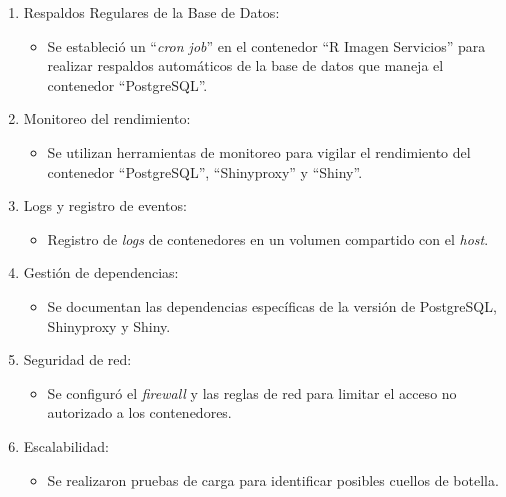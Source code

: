 \documentclass[
  12pt,
  openany]{book}
\providecommand{\tightlist}{%
  \setlength{\itemsep}{0pt}\setlength{\parskip}{0pt}}
\begin{document}
\begin{enumerate}
\def\labelenumi{\arabic{enumi}.}
\item
  Respaldos Regulares de la Base de Datos:

  \begin{itemize}
  \tightlist
  \item
    Se estableció un ``\emph{cron job}'' en el contenedor ``R Imagen Servicios'' para realizar respaldos automáticos de la base de datos que maneja el contenedor ``PostgreSQL''.
  \end{itemize}
\item
  Monitoreo del rendimiento:

  \begin{itemize}
  \tightlist
  \item
    Se utilizan herramientas de monitoreo para vigilar el rendimiento del contenedor ``PostgreSQL'', ``Shinyproxy'' y ``Shiny''.
  \end{itemize}
\item
  Logs y registro de eventos:

  \begin{itemize}
  \tightlist
  \item
    Registro de \emph{logs} de contenedores en un volumen compartido con el \emph{host}.
  \end{itemize}
\item
  Gestión de dependencias:

  \begin{itemize}
  \tightlist
  \item
    Se documentan las dependencias específicas de la versión de PostgreSQL, Shinyproxy y Shiny.
  \end{itemize}
\item
  Seguridad de red:

  \begin{itemize}
  \tightlist
  \item
    Se configuró el \emph{firewall} y las reglas de red para limitar el acceso no autorizado a los contenedores.
  \end{itemize}
\item
  Escalabilidad:

  \begin{itemize}
  \tightlist
  \item
    Se realizaron pruebas de carga para identificar posibles cuellos de botella.
  \end{itemize}
\end{enumerate}
\end{document}
